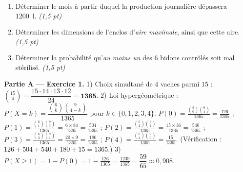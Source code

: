 \begin{enumerate}[label=\textbf{Tâche \arabic*.},leftmargin=2.4em]
\item Déterminer le mois à partir duquel la production journalière dépassera
\SI{1200}{\litre}. \hfill\textit{(1,5 pt)}
\item Déterminer les dimensions de l'enclos d'\emph{aire maximale}, ainsi que cette aire. \hfill\textit{(1,5 pt)}
\item Déterminer la probabilité qu'\emph{au moins un} des $6$ bidons contrôlés soit mal
stérilisé. \hfill\textit{(1,5 pt)}
\end{enumerate}
\par{}


\noindent\textbf{Partie A — Exercice 1.}
1) Choix simultané de $4$ vaches parmi $15$ : $\binom{15}{4}=\dfrac{15\cdot14\cdot13\cdot12}{24}=\mathbf{1365}$.
2) Loi hypergéométrique : $P(X{=}k)=\dfrac{\binom{6}{k}\binom{9}{4-k}}{1365}$ pour $k\in\{0,1,2,3,4\}$.
$P(0)=\frac{\binom90\binom94}{1365}=\frac{126}{1365}$ ;
$P(1)=\frac{\binom61\binom93}{1365}=\frac{6\times84}{1365}=\frac{504}{1365}$ ;
$P(2)=\frac{\binom62\binom92}{1365}=\frac{15\times36}{1365}=\frac{540}{1365}$ ;
$P(3)=\frac{\binom63\binom91}{1365}=\frac{20\times9}{1365}=\frac{180}{1365}$ ;
$P(4)=\frac{\binom64\binom90}{1365}=\frac{15}{1365}$.
(Vérification : $126+504+540+180+15=1365$.)
3) $P(X\ge1)=1-P(0)=1-\frac{126}{1365}=\frac{1239}{1365}=\dfrac{59}{65}\approx0{,}908$.

